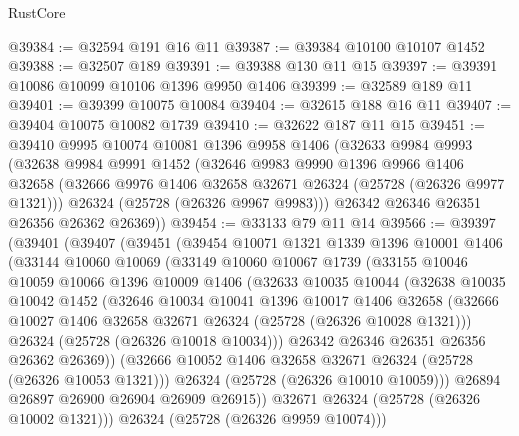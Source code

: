 \begin{lexlean}{RustCore}
\begin{coremodule}
@39384 := @32594 @191 @16 @11
@39387 := @39384 @10100 @10107 @1452
@39388 := @32507 @189
@39391 := @39388 @130 @11 @15
@39397 := @39391 @10086 @10099 @10106 @1396 @9950 @1406
@39399 := @32589 @189 @11
@39401 := @39399 @10075 @10084
@39404 := @32615 @188 @16 @11
@39407 := @39404 @10075 @10082 @1739
@39410 := @32622 @187 @11 @15
@39451 := @39410
    @9995
    @10074
    @10081
    @1396
    @9958
    @1406
    (@32633
      @9984
      @9993
      (@32638
        @9984
        @9991
        @1452
        (@32646
          @9983
          @9990
          @1396
          @9966
          @1406
          @32658
          (@32666 @9976 @1406 @32658 @32671 @26324 (@25728 (@26326 @9977 @1321)))
          @26324
          (@25728 (@26326 @9967 @9983)))
        @26342
        @26346
        @26351
        @26356
        @26362
        @26369))
@39454 := @33133 @79 @11 @14
@39566 := @39397
    (@39401
      (@39407
        (@39451
          (@39454
            @10071
            @1321
            @1339
            @1396
            @10001
            @1406
            (@33144
              @10060
              @10069
              (@33149
                @10060
                @10067
                @1739
                (@33155
                  @10046
                  @10059
                  @10066
                  @1396
                  @10009
                  @1406
                  (@32633
                    @10035
                    @10044
                    (@32638
                      @10035
                      @10042
                      @1452
                      (@32646
                        @10034
                        @10041
                        @1396
                        @10017
                        @1406
                        @32658
                        (@32666 @10027 @1406 @32658 @32671 @26324 (@25728 (@26326 @10028 @1321)))
                        @26324
                        (@25728 (@26326 @10018 @10034)))
                      @26342
                      @26346
                      @26351
                      @26356
                      @26362
                      @26369))
                  (@32666 @10052 @1406 @32658 @32671 @26324 (@25728 (@26326 @10053 @1321)))
                  @26324
                  (@25728 (@26326 @10010 @10059)))
                @26894
                @26897
                @26900
                @26904
                @26909
                @26915))
            @32671
            @26324
            (@25728 (@26326 @10002 @1321)))
          @26324
          (@25728 (@26326 @9959 @10074)))

\end{coremodule}
\end{lexlean}

